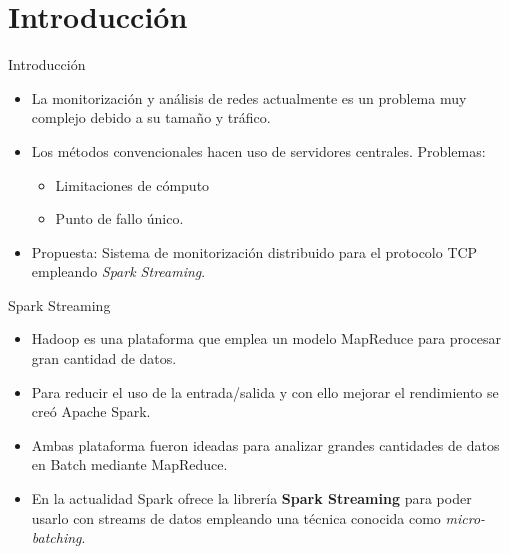 \documentclass[aspectratio=149]{beamer}
\begin{document}
\section{Introducción}
\begin{frame}[label=intro]{Introducción}
    \begin{itemize}
        \item La monitorización y análisis de redes actualmente es un problema muy complejo debido a su tamaño y tráfico.
        \item Los métodos convencionales hacen uso de servidores centrales. Problemas:
        \begin{itemize}
            \item Limitaciones de cómputo
            \item Punto de fallo único.
        \end{itemize}
        \item Propuesta: Sistema de monitorización distribuido para el protocolo TCP empleando \textit{Spark Streaming}.
    \end{itemize}
\end{frame}

\begin{frame}[label=relat]{Spark Streaming}
    \begin{itemize}
        \item Hadoop es una plataforma que emplea un modelo MapReduce para procesar gran cantidad de datos.
        \item Para reducir el uso de la entrada/salida y con ello mejorar el rendimiento se creó Apache Spark.
        \item Ambas plataforma fueron ideadas para analizar grandes cantidades de datos en Batch mediante MapReduce.
        \item En la actualidad Spark ofrece la librería \textbf{Spark Streaming} para poder usarlo con streams de datos empleando una técnica conocida como \textit{micro-batching}.
    \end{itemize}
\end{frame}

\end{document}
